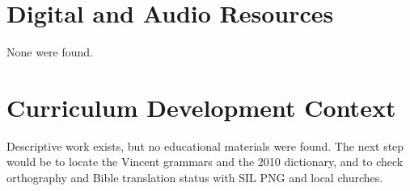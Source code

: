 \documentclass[12pt]{article}
\begin{document}
\section{Digital and Audio Resources}
None were found.

\section{Curriculum Development Context}
Descriptive work exists, but no educational materials were found. The next step would be to locate the Vincent grammars and the 2010 dictionary, and to check orthography and Bible translation status with SIL PNG and local churches.
\end{document}
